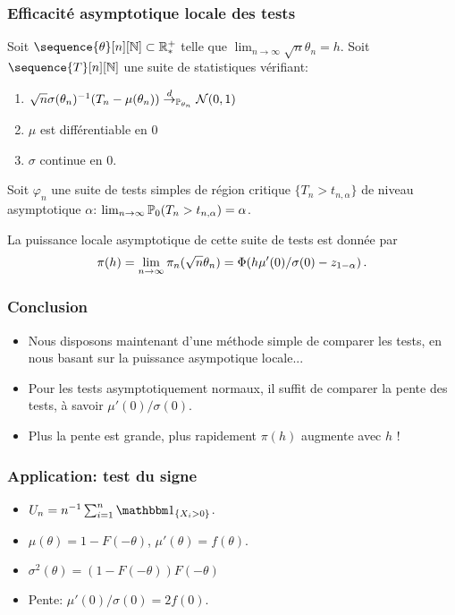 \begin{frame}
\frametitle{Efficacité asymptotique locale des tests}
\begin{theo}
Soit $\sequence{\theta}[n][\nset] \subset \rset^+_*$ telle que $\lim_{n \to \infty}\sqrt{n} \theta_n = h$.
Soit $\sequence{T}[n][\nset]$ une suite de statistiques vérifiant:
\begin{enumerate}
\item $\sqrt{n} \sigma(\theta_n)^{-1} (T_n - \mu(\theta_n)) \stackrel{d}{\rightarrow}_{\operatorname{{\mathbb P}}_{\theta_n}} \mathcal{N}(0,1)$
\item $\mu$ est différentiable en $0$
\item $\sigma$ continue en $0$.
\end{enumerate}
Soit  $\varphi_n$ une suite de tests simples de région critique $\{ T_n > t_{n,\alpha}\}$  de niveau asymptotique $\alpha$: $\lim_{n \to \infty} \operatorname{{\mathbb P}}_{0}( T_n > t_{n,\alpha})= \alpha$.

\bigskip

La \alert{puissance locale asymptotique} de cette suite de tests est donnée par
\[
\pi(h)= \lim_{n \to \infty} \pi_n( \sqrt{n} \theta_n)= \Phi(h
\mu'(0)/\sigma(0) - z_{1-\alpha}) \,.
\]
\end{theo}
\end{frame}

\begin{frame}
\frametitle{Conclusion}
\begin{itemize}
\item Nous disposons maintenant d'une méthode simple de comparer les tests, en nous basant sur la puissance asympotique locale...
\item Pour les tests asymptotiquement normaux, il suffit de comparer la \alert{pente} des tests, à savoir \alert{$\mu'(0)/\sigma(0)$}.
\item Plus la pente est grande,  plus rapidement $\pi(h)$ augmente avec $h$ !
\end{itemize}
\end{frame}


\begin{frame}
\frametitle{Application: test du signe}
\begin{itemize}
\item $U_n= n^{-1} \sum_{i=1}^n \indi{X_i > 0}$.
\item $\mu(\theta)= 1 - F(-\theta)$, $\mu'(\theta)=  f(\theta)$.
\item $\sigma^2(\theta)= (1 - F(-\theta)) F(-\theta)$
\item \alert{Pente:} $\mu'(0)/\sigma(0)= 2 f(0)$.
\end{itemize}
\end{frame}

